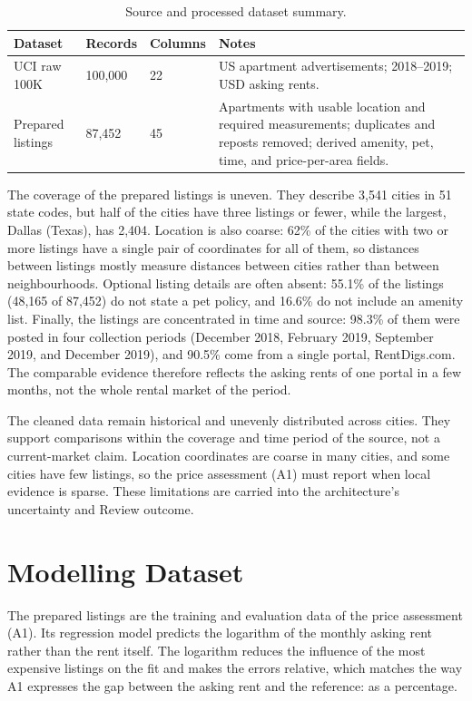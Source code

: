 \documentclass[12pt,a4paper]{report}
\begin{document}
\begin{table}[htbp]
\centering
\caption{Source and processed dataset summary.}
\label{tab:datasets}
\begin{tabularx}{\textwidth}{p{3.0cm} p{2.0cm} p{2.0cm} X}
\toprule
\textbf{Dataset} & \textbf{Records} & \textbf{Columns} & \textbf{Notes} \\
\midrule
UCI raw 100K & 100,000 & 22 & US apartment advertisements; 2018--2019; USD asking rents. \\
Prepared listings & 87,452 & 45 & Apartments with usable location and required measurements; duplicates and reposts removed; derived amenity, pet, time, and price-per-area fields. \\
\bottomrule
\end{tabularx}
\end{table}

The coverage of the prepared listings is uneven. They describe 3,541
cities in 51 state codes, but half of the cities have three listings or
fewer, while the largest, Dallas (Texas), has 2,404. Location is also
coarse: 62\% of the cities with two or more listings have a single pair of
coordinates for all of them, so distances between listings mostly measure
distances between cities rather than between neighbourhoods. Optional
listing details are often absent: 55.1\% of the listings (48,165 of 87,452)
do not state a pet policy, and 16.6\% do not include an amenity list.
Finally, the listings are concentrated in time and source: 98.3\% of them
were posted in four collection periods (December 2018, February 2019,
September 2019, and December 2019), and 90.5\% come from a single portal,
RentDigs.com. The comparable evidence therefore reflects the asking rents
of one portal in a few months, not the whole rental market of the period.

The cleaned data remain historical and unevenly distributed across cities.
They support comparisons within the coverage and time period of the source,
not a current-market claim. Location coordinates are coarse in many cities,
and some cities have few listings, so the price assessment (A1) must
report when local evidence is sparse. These limitations are carried into the
architecture's uncertainty and Review outcome.

\section{Modelling Dataset}
\label{sec:modelling-dataset}

The prepared listings are the training and evaluation data of the price
assessment (A1). Its regression model predicts the logarithm of the monthly
asking rent rather than the rent itself. The logarithm reduces the
influence of the most expensive listings on the fit and makes the errors
relative, which matches the way A1 expresses the gap between the asking
rent and the reference: as a percentage.
\end{document}
